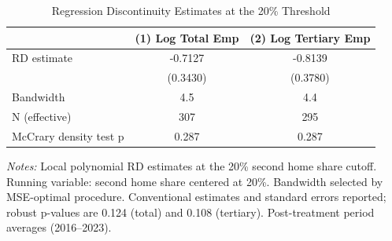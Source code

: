 \begin{table}[htbp]
\centering
\caption{Regression Discontinuity Estimates at the 20\% Threshold}
\label{tab:rdd}
\begin{tabular}{lcc}
\toprule
 & (1) Log Total Emp & (2) Log Tertiary Emp \\
\midrule
RD estimate & -0.7127 &-0.8139 \\
 & (0.3430) &(0.3780) \\
\addlinespace
Bandwidth & 4.5 &4.4 \\
N (effective) & 307 &295 \\
McCrary density test p & 0.287 & 0.287 \\
\bottomrule
\end{tabular}
\begin{tablenotes}[flushleft]\small
\item \textit{Notes:} Local polynomial RD estimates at the 20\% second home share cutoff.
Running variable: second home share centered at 20\%. Bandwidth selected by MSE-optimal procedure.
Conventional estimates and standard errors reported; robust p-values are 0.124 (total) and 0.108 (tertiary).
Post-treatment period averages (2016--2023).
\end{tablenotes}
\end{table}
